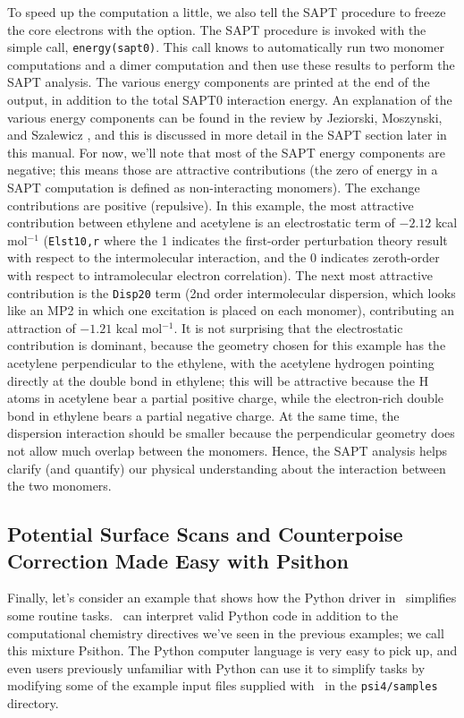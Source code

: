 To speed up the computation a little, we also tell the SAPT procedure to
freeze the core electrons with the  option.  The SAPT
procedure is invoked with the simple call, {\tt energy(\textquotesingle sapt0\textquotesingle)}.  This
call knows to automatically run two monomer computations and a dimer
computation and then use these results to perform the SAPT analysis.  The
various energy components are printed at the end of the output, in addition
to the total SAPT0 interaction energy.  An explanation of the various
energy components can be found in the review by Jeziorski, Moszynski, and
Szalewicz \cite{Jeziorski:1994:1887}, and this is discussed in more detail
in the SAPT section later in this manual.  For now, we'll note that most of
the SAPT energy components are negative; this means those are attractive
contributions (the zero of energy in a SAPT computation is defined as
non-interacting monomers).  The exchange contributions are positive
(repulsive).   In this example, the most attractive contribution between
ethylene and acetylene is an electrostatic term of $-2.12$ kcal mol$^{-1}$
({\tt Elst10,r} where the 1 indicates the first-order
perturbation theory result with respect to the intermolecular interaction,
and the 0 indicates zeroth-order with respect to intramolecular electron
correlation).  The next most attractive contribution is the {\tt Disp20}
term (2nd order intermolecular dispersion, which looks like an MP2 in which
one excitation is placed on each monomer), contributing an attraction of
$-1.21$ kcal mol$^{-1}$.  It is not surprising that the electrostatic
contribution is dominant, because the geometry chosen for this example has the
acetylene perpendicular to the ethylene, with the acetylene hydrogen
pointing directly at the double bond in ethylene; this will be attractive
because the H atoms in acetylene bear a partial positive charge, while the
electron-rich double bond in ethylene bears a partial negative charge.  At
the same time, the dispersion interaction should be smaller because the
perpendicular geometry does not allow much overlap between the monomers.
Hence, the SAPT analysis helps clarify (and quantify) our physical
understanding about the interaction between the two monomers. 

\subsection{Potential Surface Scans and Counterpoise Correction Made Easy
with Psithon}

Finally, let's consider an example that shows how the Python driver
in \PSIfour\ simplifies some routine tasks.  \PSIfour\ can interpret
valid Python code in addition to the computational chemistry directives
we've seen in the previous examples; we call this mixture Psithon.
The Python computer language is very easy to pick up, and even users
previously unfamiliar with Python can use it to simplify tasks by
modifying some of the example input files supplied with \PSIfour\
in the {\tt psi4/samples} directory.

